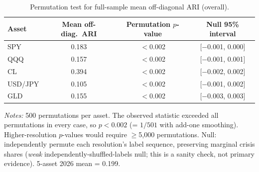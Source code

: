 \documentclass[preprint,12pt,authoryear]{elsarticle}
\begin{document}
\begin{table}[!htbp]
\centering
\small
\setlength{\tabcolsep}{6pt}
\caption{Permutation test for full-sample mean off-diagonal ARI (overall).}
\label{tab:perm_overall}
\begin{tabular}{lccc}
\toprule
Asset & Mean off-diag.\ ARI & Permutation $p$-value & Null 95\% interval \\
\midrule
SPY & 0.183 & $<$0.002 & [$-$0.001, 0.000] \\
QQQ & 0.157 & $<$0.002 & [$-$0.001, 0.001] \\
CL & 0.394 & $<$0.002 & [$-$0.002, 0.002] \\
USD/JPY & 0.105 & $<$0.002 & [$-$0.001, 0.002] \\
GLD & 0.155 & $<$0.002 & [$-$0.003, 0.003] \\
\bottomrule
\end{tabular}
\par\medskip
{\footnotesize\justifying
\textit{Notes:} 500 permutations per asset. The observed statistic exceeded all permutations in every case, so $p < 0.002$ (= $1/501$ with add-one smoothing). Higher-resolution $p$-values would require $\ge$5{,}000 permutations. Null: independently permute each resolution's label sequence, preserving marginal crisis shares (\emph{weak} independently-shuffled-labels null; this is a sanity check, not primary evidence). 5-asset 2026 mean = 0.199.
\par}
\end{table}
\end{document}

